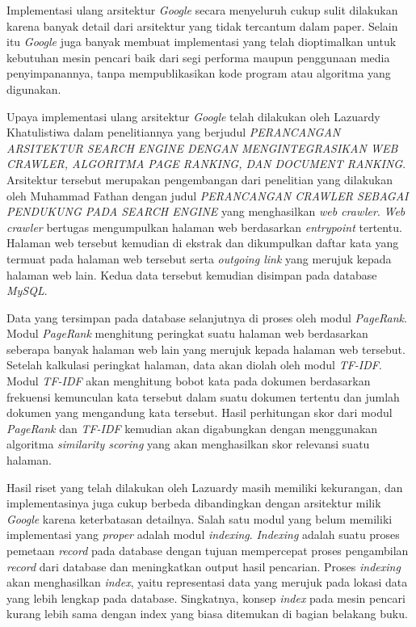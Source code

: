 Implementasi ulang arsitektur \emph{Google} secara menyeluruh cukup sulit
dilakukan karena banyak detail dari arsitektur yang tidak tercantum dalam paper.
Selain itu \emph{Google} juga banyak membuat implementasi yang telah
dioptimalkan untuk kebutuhan mesin pencari baik dari segi performa maupun
penggunaan media penyimpanannya, tanpa mempublikasikan kode program atau
algoritma yang digunakan.

Upaya implementasi ulang arsitektur \emph{Google} telah dilakukan oleh Lazuardy
Khatulistiwa dalam penelitiannya yang berjudul \emph{PERANCANGAN ARSITEKTUR
SEARCH ENGINE DENGAN MENGINTEGRASIKAN WEB CRAWLER, ALGORITMA PAGE RANKING, DAN
DOCUMENT RANKING}. Arsitektur tersebut merupakan pengembangan dari penelitian
yang dilakukan oleh Muhammad Fathan dengan judul
\textit{PERANCANGAN CRAWLER SEBAGAI PENDUKUNG PADA SEARCH ENGINE} yang
menghasilkan \emph{web crawler}. \emph{Web crawler} bertugas mengumpulkan
halaman web berdasarkan \emph{entrypoint} tertentu.  Halaman web tersebut
kemudian di ekstrak dan dikumpulkan daftar kata yang termuat pada halaman web
tersebut serta \emph{outgoing link} yang merujuk kepada halaman web lain. Kedua
data tersebut kemudian disimpan pada database \emph{MySQL}.

Data yang tersimpan pada database selanjutnya di proses oleh modul
\emph{PageRank}. Modul \emph{PageRank} menghitung peringkat suatu halaman web
berdasarkan seberapa banyak halaman web lain yang merujuk kepada halaman web
tersebut. Setelah kalkulasi peringkat halaman, data akan diolah oleh modul
\emph{TF-IDF}. Modul \emph{TF-IDF} akan menghitung bobot kata pada dokumen
berdasarkan frekuensi kemunculan kata tersebut dalam suatu dokumen tertentu dan
jumlah dokumen yang mengandung kata tersebut. Hasil perhitungan skor dari modul
\emph{PageRank} dan \emph{TF-IDF} kemudian akan digabungkan dengan menggunakan
algoritma \emph{similarity scoring} yang akan menghasilkan skor relevansi suatu
halaman.

Hasil riset yang telah dilakukan oleh Lazuardy masih memiliki kekurangan, dan
implementasinya juga cukup berbeda dibandingkan dengan arsitektur milik
\emph{Google} karena keterbatasan detailnya.  Salah satu modul yang belum
memiliki implementasi yang \textit{proper} adalah modul \emph{indexing}.
\emph{Indexing} adalah suatu proses pemetaan \emph{record} pada database dengan
tujuan mempercepat proses pengambilan \emph{record} dari database dan
meningkatkan output hasil pencarian. Proses \emph{indexing} akan menghasilkan
\emph{index}, yaitu representasi data yang merujuk pada lokasi data yang lebih
lengkap pada database. Singkatnya, konsep \emph{index} pada mesin pencari kurang
lebih sama dengan index yang biasa ditemukan di bagian belakang buku.

